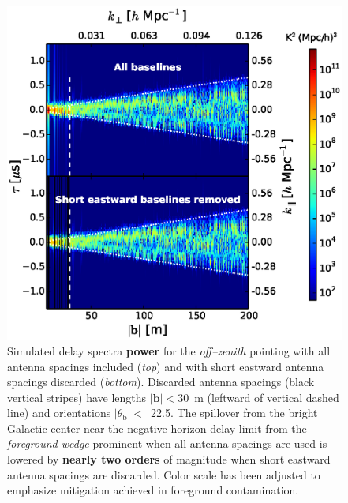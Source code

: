 \documentclass[preprint2,iop,numberedappendix]{emulateapj}
\begin{document}
\begin{figure}[htb]
\centering
\includegraphics[width=\linewidth]{fig12.eps}
\caption{Simulated delay spectra {\bf power} for the {\it off--zenith} pointing with all antenna spacings included ({\it top}) and with short eastward antenna spacings discarded ({\it bottom}). Discarded antenna spacings (black vertical stripes) have lengths $|\boldsymbol{b}|<30$~m (leftward of vertical dashed line) and orientations $|\theta_\textrm{b}|<$~22.5\arcdeg. The spillover from the bright Galactic center near the negative horizon delay limit from the {\it foreground wedge} prominent when all antenna spacings are used is lowered by {\bf nearly two orders} of magnitude when short eastward antenna spacings are discarded. Color scale has been adjusted to emphasize mitigation achieved in foreground contamination. \label{fig:before-after}}
\end{figure}
\end{document}
